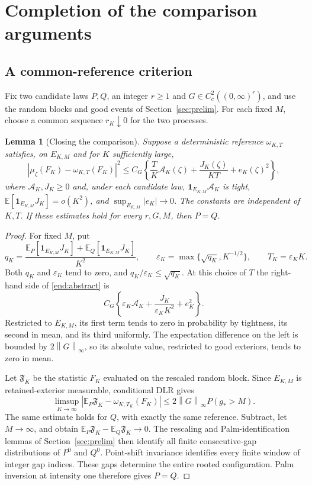 \documentclass[11pt,reqno]{amsart}
\numberwithin{equation}{section}
\newtheorem{lemma}[theorem]{Lemma}
\theoremstyle{definition}
\newcommand{\E}{\mathbb E}
\newcommand{\1}{\mathbf 1}
\newcommand{\abs}[1]{\left|#1\right|}
\newcommand{\norm}[1]{\left\lVert#1\right\rVert}
\begin{document}
\section{Completion of the comparison arguments}\label{sec:completion}

\subsection{A common-reference criterion}
Fix two candidate laws $P,Q$, an integer $r\ge1$ and
$G\in C_c^2((0,\infty)^r)$, and use the random blocks and good events
of Section~\ref{sec:prelim}. For each fixed $M$, choose a common
sequence $r_K\downarrow0$ for the two processes.

\begin{lemma}[Closing the comparison]\label{end:criterion}
Suppose a deterministic reference $\omega_{K,T}$ satisfies, on
$E_{K,M}$ and for $K$ sufficiently large,
\begin{equation}\label{end:abstract}
\abs{\mu_\zeta(F_K)-\omega_{K,T}(F_K)}^2
\le C_G\left\{\frac{T}{K}\mathcal A_K(\zeta)
+\frac{J_K(\zeta)}{KT}+e_K(\zeta)^2\right\},
\end{equation}
where $\mathcal A_K,J_K\ge0$ and, under each candidate law, $\1_{E_{K,M}}\mathcal A_K$ is tight,
$\E[\1_{E_{K,M}}J_K]=o(K^2)$, and
$\sup_{E_{K,M}}|e_K|\to0$. The constants are independent of $K,T$.
If these estimates hold for every $r,G,M$, then $P=Q$.
\end{lemma}

\begin{proof}
For fixed $M$, put
\[
q_K=\frac{\E_P[\1_{E_{K,M}}J_K]
+\E_Q[\1_{E_{K,M}}J_K]}{K^2},\qquad
\varepsilon_K=\max\{\sqrt{q_K},K^{-1/2}\},\qquad
T_K=\varepsilon_KK.
\]
Both $q_K$ and $\varepsilon_K$ tend to zero, and
$q_K/\varepsilon_K\le\sqrt{q_K}$. At this choice of $T$ the
right-hand side of \eqref{end:abstract} is
\[
C_G\left\{\varepsilon_K\mathcal A_K+
\frac{J_K}{\varepsilon_KK^2}+e_K^2\right\}.
\]
Restricted to $E_{K,M}$, its first term tends to zero in probability
by tightness, its second in mean, and its third uniformly.
The expectation difference on the left is bounded by $2\norm G_\infty$,
so its absolute value, restricted to good exteriors, tends to zero in mean.

Let $\mathfrak F_K$ be the statistic $F_K$ evaluated on the rescaled
random block. Since $E_{K,M}$ is retained-exterior measurable, conditional
DLR gives
\[
\limsup_{K\to\infty}
\abs{\E_P\mathfrak F_K-\omega_{K,T_K}(F_K)}
\le 2\norm G_\infty P(g_*>M).
\]
The same estimate holds for $Q$, with exactly the same reference.
Subtract, let $M\to\infty$, and obtain
$\E_P\mathfrak F_K-\E_Q\mathfrak F_K\to0$.
The rescaling and Palm-identification lemmas of
Section~\ref{sec:prelim} then identify all finite consecutive-gap
distributions of $P^0$ and $Q^0$.
Point-shift invariance identifies every finite window of integer
gap indices. These gaps determine the entire rooted configuration.
Palm inversion at intensity one therefore gives $P=Q$.
\end{proof}
\end{document}

